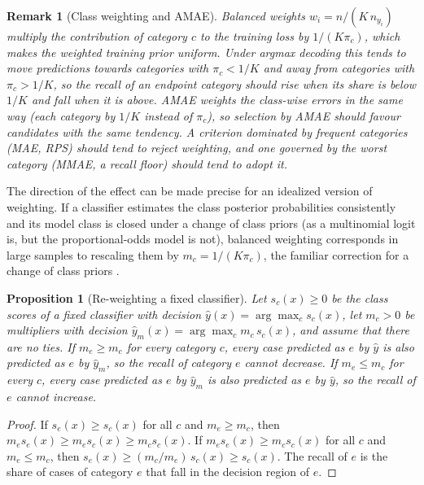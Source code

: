 \documentclass[pdflatex,sn-mathphys-ay]{sn-jnl}
\theoremstyle{thmstyleone}
\newtheorem{proposition}{Proposition}
\theoremstyle{thmstylethree}
\newtheorem{remark}{Remark}
\begin{document}
\begin{remark}[Class weighting and AMAE]\label{rem:weights}
Balanced weights $w_i=n/(K\,n_{y_i})$ multiply the contribution of category $c$ to the training loss by $1/(K\pi_c)$, which makes the weighted training prior uniform. Under argmax decoding this tends to move predictions towards categories with $\pi_c<1/K$ and away from categories with $\pi_c>1/K$, so the recall of an endpoint category should rise when its share is below $1/K$ and fall when it is above. AMAE weights the class-wise errors in the same way (each category by $1/K$ instead of $\pi_c$), so selection by AMAE should favour candidates with the same tendency. A criterion dominated by frequent categories (MAE, RPS) should tend to reject weighting, and one governed by the worst category (MMAE, a recall floor) should tend to adopt it.
\end{remark}

The direction of the effect can be made precise for an idealized version of weighting. If a classifier estimates the class posterior probabilities consistently and its model class is closed under a change of class priors (as a multinomial logit is, but the proportional-odds model is not), balanced weighting corresponds in large samples to rescaling them by $m_c=1/(K\pi_c)$, the familiar correction for a change of class priors \citep{Saerens2002}.

\begin{proposition}[Re-weighting a fixed classifier]\label{prop:reweight}
Let $s_c(x)\ge0$ be the class scores of a fixed classifier with decision $\hat y(x)=\arg\max_c s_c(x)$, let $m_c>0$ be multipliers with decision $\hat y_m(x)=\arg\max_c m_c\,s_c(x)$, and assume that there are no ties. If $m_e\ge m_c$ for every category $c$, every case predicted as $e$ by $\hat y$ is also predicted as $e$ by $\hat y_m$, so the recall of category $e$ cannot decrease. If $m_e\le m_c$ for every $c$, every case predicted as $e$ by $\hat y_m$ is also predicted as $e$ by $\hat y$, so the recall of $e$ cannot increase.
\end{proposition}

\begin{proof}
If $s_e(x)\ge s_c(x)$ for all $c$ and $m_e\ge m_c$, then $m_e s_e(x)\ge m_e s_c(x)\ge m_c s_c(x)$. If $m_e s_e(x)\ge m_c s_c(x)$ for all $c$ and $m_e\le m_c$, then $s_e(x)\ge (m_c/m_e)\,s_c(x)\ge s_c(x)$. The recall of $e$ is the share of cases of category $e$ that fall in the decision region of $e$.
\end{proof}
\end{document}
